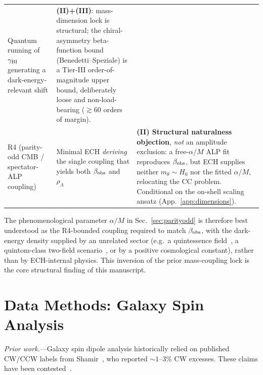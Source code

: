 \documentclass[aps,prd,twocolumn,superscriptaddress,showpacs,preprintnumbers,nofootinbib,longbibliography,floatfix]{revtex4-2}
\begin{document}
\begin{table}[tb]
\begin{ruledtabular}
\begin{tabular}{lll}
\parbox[t]{0.40\textwidth}{\raggedright Quantum running of $\gamma_{\rm BI}$
generating a dark-energy-relevant shift\strut} &
\parbox[t]{0.32\textwidth}{\raggedright \textbf{(II)+(III)}: mass-dimension
lock is structural; the chiral-asymmetry beta-function bound
(Benedetti--Speziale) is a Tier-III order-of-magnitude upper bound,
deliberately loose and non-load-bearing ($\gtrsim 60$ orders of
margin).\strut} \\[3pt]
\parbox[t]{0.18\textwidth}{\raggedright R4 (parity-odd CMB / spectator-ALP
coupling)\strut} &
\parbox[t]{0.40\textwidth}{\raggedright Minimal ECH \emph{deriving} the single
coupling that yields both $\beta_{\rm obs}$ and $\rho_\Lambda$\strut} &
\parbox[t]{0.32\textwidth}{\raggedright \textbf{(II) Structural naturalness
objection}, \emph{not} an amplitude exclusion: a free-$\alpha/M$ ALP fit
reproduces $\beta_{\rm obs}$, but ECH supplies neither $m_\theta\!\sim\!H_0$
nor the fitted $\alpha/M$, relocating the CC problem. Conditional on the
on-shell scaling ansatz (App.~\ref{app:dimensions}).\strut} \\
\end{tabular}
\end{ruledtabular}
\end{table}

The phenomenological parameter $\alpha/M$ in Sec.~\ref{sec:parityodd}
is therefore best understood as the R4-bounded coupling required to
match $\beta_{\rm obs}$, with the dark-energy density supplied by an
unrelated sector (e.g.\ a quintessence field~\cite{Carroll1998}, a
quintom-class two-field scenario~\cite{Cai2010quintomReview}, or by a positive
cosmological constant), rather than by ECH-internal physics. This
inversion of the prior mass-coupling lock is the core structural
finding of this manuscript.


\section{Data Methods: Galaxy Spin Analysis}\label{sec:data_galaxy}

\textit{Prior work.}---Galaxy spin dipole analysis historically relied on published
CW/CCW labels from Shamir~\cite{Shamir2022,Shamir2024}, who reported ${\sim}1$--$3\%$
CW excesses. These claims have been contested~\cite{PatelDesmond2024,Philcox2025}.
\end{document}
